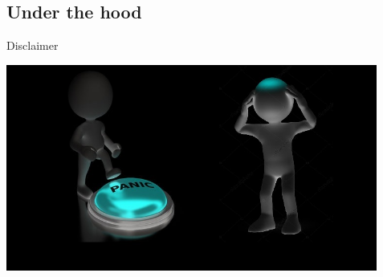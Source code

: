 \documentclass[aspectratio=43]{beamer}
\begin{document}
 \subsection{Under the hood}

\begin{frame}{Disclaimer}

 \begin{center}
 \includegraphics[width=12.2cm]{images/panic.jpg}
 \end{center}


\end{frame}
 
\end{document}
